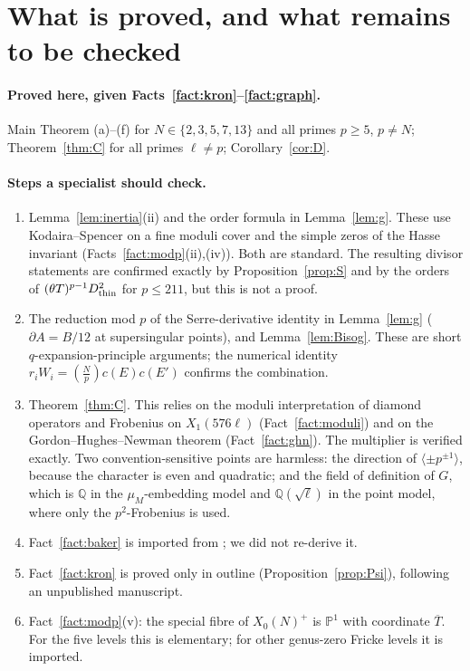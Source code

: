 \documentclass[11pt,a4paper]{article}
\numberwithin{equation}{section}
\theoremstyle{definition}
\theoremstyle{remark}
\newcommand{\Q}{\mathbb Q}
\newcommand{\Lp}[1]{\left(\frac{#1}{p}\right)}
\begin{document}
\section{What is proved, and what remains to be checked}\label{sec:status}
\paragraph{Proved here, given Facts~\ref{fact:kron}--\ref{fact:graph}.} Main Theorem (a)--(f) for
$N\in\{2,3,5,7,13\}$ and all primes $p\ge5$, $p\ne N$; Theorem~\ref{thm:C} for all primes $\ell\ne p$;
Corollary~\ref{cor:D}.

\paragraph{Steps a specialist should check.}
\begin{enumerate}[label=(U\arabic*)]
\item Lemma~\ref{lem:inertia}(ii) and the order formula in Lemma~\ref{lem:g}. These use Kodaira--Spencer on a
fine moduli cover and the simple zeros of the Hasse invariant (Facts~\ref{fact:modp}(ii),(iv)). Both
are standard. The resulting divisor statements are confirmed exactly by Proposition~\ref{prop:S} and
by the orders of $(\theta T)^{p-1}D_{\rm thin}^2$ for $p\le 211$, but this is not a proof.
\item The reduction mod $p$ of the Serre-derivative identity in Lemma~\ref{lem:g} ($\partial A=B/12$
at supersingular points), and Lemma~\ref{lem:Bisog}. These are short $q$-expansion-principle
arguments; the numerical identity $r_iW_i=\Lp Nc(E)c(E')$ confirms the combination.
\item Theorem~\ref{thm:C}. This relies on the moduli interpretation of diamond operators and Frobenius
on $X_1(576\ell)$ (Fact~\ref{fact:moduli}) and on the Gordon--Hughes--Newman theorem
(Fact~\ref{fact:ghn}). The multiplier is verified exactly. Two convention-sensitive points are harmless: the
direction of $\langle\pm p^{\pm1}\rangle$, because the character is even and quadratic; and the field of definition of
$G$, which is $\Q$ in the $\mu_M$-embedding model and $\Q(\sqrt\ell)$ in the point model, where only the $p^2$-Frobenius is used.
\item Fact~\ref{fact:baker} is imported from \citet{Baker98}; we did not re-derive it.
\item Fact~\ref{fact:kron} is proved only in outline (Proposition~\ref{prop:Psi}), following an unpublished manuscript.
\item Fact~\ref{fact:modp}(v): the special fibre of $X_0(N)^+$ is $\mathbb P^1$ with coordinate $\overline T$. For the five
levels this is elementary; for other genus-zero Fricke levels it is imported.
\end{enumerate}
\end{document}

